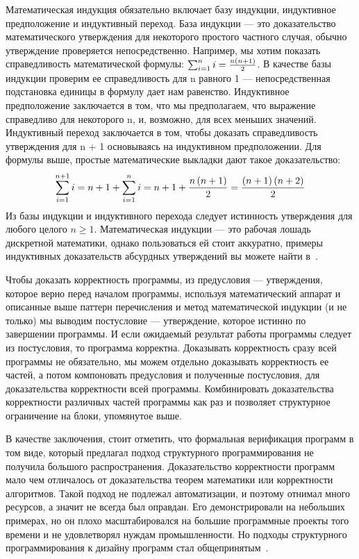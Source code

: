 Математическая индукция обязательно включает базу индукции, индуктивное предположение и индуктивный переход. База индукции — это доказательство математического утверждения для некоторого простого частного случая, обычно утверждение проверяется непосредственно. Например, мы хотим показать справедливость математической формулы: $\sum_{i=1}^{n} i = {n \left( n + 1\right)\over 2}$. В качестве базы индукции проверим ее справедливость для n равного 1 — непосредственная подстановка единицы в формулу дает нам равенство.
	Индуктивное предположение заключается в том, что мы предполагаем, что выражение справедливо для некоторого n, и, возможно, для всех меньших значений. Индуктивный переход заключается в том, чтобы доказать справедливость утверждения для n + 1 основываясь на индуктивном предположении. Для формулы выше, простые математические выкладки дают такое доказательство:
\[
	\sum_{i = 1}^{n + 1} i = n + 1 + \sum_{i = 1}^{n} i = n + 1 + {n\left( n + 1\right)\over 2} = {\left( n + 1\right) \left( n + 2\right)\over 2}
\]
Из базы индукции и индуктивного перехода следует истинность утверждения для любого целого $n \ge 1$. Математическая индукции — это рабочая лошадь дискретной математики, однако пользоваться ей стоит аккуратно, примеры индуктивных доказательств абсурдных утверждений вы можете найти в~\cite{Shen}.

Чтобы доказать корректность программы, из предусловия — утверждения, которое верно перед началом программы, используя математический аппарат и описанные выше паттерн перечисления и метод математической индукции (и не только) мы выводим постусловие — утверждение, которое истинно по завершении программы. И если ожидаемый результат работы программы следует из постусловия, то программа корректна. Доказывать корректность сразу всей программы не обязательно, мы можем отдельно доказывать корректность ее частей, а потом компоновать предусловия и полученные постусловия, для доказательства корректности всей программы. Комбинировать доказательства корректности различных частей программы как раз и позволяет структурное ограничение на блоки, упомянутое выше.

В качестве заключения, стоит отметить, что формальная верификация программ в том виде, который предлагал подход структурного программирования не получила большого распространения. Доказательство корректности программ мало чем отличалось от доказательства теорем математики или корректности алгоритмов. Такой подход не подлежал автоматизации, и поэтому отнимал много ресурсов, а значит не всегда был оправдан. Его демонстрировали на небольших примерах, но он плохо масштабировался на большие программные проекты того времени и не удовлетворял нуждам промышленности. Но подходы структурного программирования к дизайну программ стал общепринятым~\cite{Floyd:1979:PP}.

